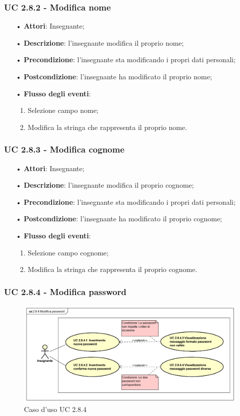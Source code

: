 \subsubsection{UC 2.8.2 - Modifica nome}
\begin{itemize}
	\item[•]\textbf{Attori}: Insegnante;
	\item[•]\textbf{Descrizione}: l'insegnante modifica il proprio nome;
	\item[•]\textbf{Precondizione}: l'insegnante sta modificando i propri dati personali;
	\item[•]\textbf{Postcondizione}: l'insegnante ha modificato il proprio nome; 
	\item[•]\textbf{Flusso degli eventi}: 
	\begin{enumerate}
		\item Selezione campo nome;
		\item Modifica la stringa che rappresenta il proprio nome.
	\end{enumerate}
\end{itemize}

\subsubsection{UC 2.8.3 - Modifica cognome}
\begin{itemize}
	\item[•]\textbf{Attori}: Insegnante;
	\item[•]\textbf{Descrizione}: l'insegnante modifica il proprio cognome;
	\item[•]\textbf{Precondizione}: l'insegnante sta modificando i propri dati personali;
	\item[•]\textbf{Postcondizione}: l'insegnante ha modificato il proprio cognome; 
	\item[•]\textbf{Flusso degli eventi}: 
	\begin{enumerate}
		\item Selezione campo cognome;
		\item Modifica la stringa che rappresenta il proprio cognome.
	\end{enumerate}
\end{itemize}


\subsubsection{UC 2.8.4 - Modifica password}
\begin{figure}[H]
\centering
\includegraphics[width=17cm]{img/modificapasswordinsegnante.png} 
\caption{Caso d'uso UC 2.8.4}
\end{figure}

